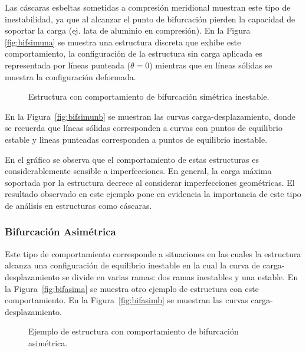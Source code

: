 Las cáscaras esbeltas sometidas a compresión meridional muestran este tipo de inestabilidad, ya que al alcanzar el punto de bifurcación pierden la capacidad de soportar la carga (ej. lata de aluminio en compresión). %
%
En la Figura \ref{fig:bifsimuna} se muestra una estructura discreta que exhibe este comportamiento, la configuración de la estructura sin carga aplicada es representada por líneas punteada ($\theta = 0$) mientras que en líneas sólidas se muestra la configuración deformada.

\begin{figure}[htb]
	\centering
		\centering
	\hspace{0.05\textwidth}
		\centering
	\caption{Estructura con comportamiento de bifurcación simétrica inestable.}
	\label{fig:fig11}
\end{figure}

En la Figura~\ref{fig:bifsimunb} se muestran las curvas carga-desplazamiento, donde se recuerda que líneas sólidas corresponden a curvas con puntos de equilibrio estable y lìneas punteadas corresponden a puntos de equilibrio inestable. %

En el gráfico se observa que el comportamiento de estas estructuras es considerablemente sensible a imperfecciones. En general, la carga máxima soportada por la estructura decrece al considerar imperfecciones geométricas. %
%
El resultado observado en este ejemplo pone en evidencia la importancia de este tipo de análisis en estructuras como cáscaras.
%

\subsubsection{Bifurcación Asimétrica}

Este tipo de comportamiento corresponde a situaciones en las cuales la estructura alcanza una configuración de equilibrio inestable en la cual la curva de carga-desplazamiento se divide en varias ramas: dos ramas inestables y una estable. %
%
En la Figura~\ref{fig:bifasima} se muestra otro ejemplo de estructura con este comportamiento. %
%
En la Figura~\ref{fig:bifasimb} se muestran las curvas carga-desplazamiento.

\begin{figure}[htb]
	\centering
	\hspace{0.003\textwidth}
	\caption{Ejemplo de estructura con comportamiento de bifurcación asimétrica.}
	\label{fig:fig12}
\end{figure}

